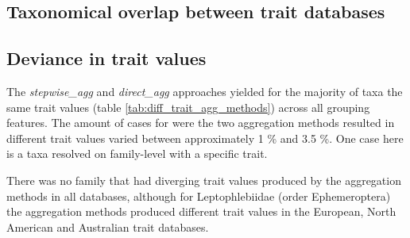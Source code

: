 \documentclass{article}
\begin{document}
\subsection{Taxonomical overlap between trait databases}

\subsection{Deviance in trait values}


The \textit{stepwise\_agg} and \textit{direct\_agg} approaches yielded for the majority of taxa 
the same trait values (table \ref{tab:diff_trait_agg_methods}) across all grouping features.
The amount of cases for were the two aggregation methods resulted in different trait values varied between approximately 1 \% and 3.5 \%.
One case here is a taxa resolved on family-level with a specific trait.


There was no family that had diverging trait values produced by the aggregation methods in all databases, although for Leptophlebiidae (order Ephemeroptera) the aggregation methods produced different trait values in the European, North American and Australian trait databases.
\end{document}
